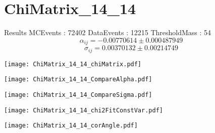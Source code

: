 \documentclass[a4paper,12pt]{article}
\begin{document}
\section{ChiMatrix\_14\_14}
\begin{minipage}{0.49\linewidth} Results \newline
MCEvents : 72402\newline
DataEvents : 12215 \newline
ThresholdMass : 54\\
$$\alpha_{ij} = -0.00770614\pm 0.000487949$$
$$\sigma_{ij} = 0.00370132\pm 0.00214749$$
\end{minipage}\hfill
\begin{minipage}{0.49\linewidth} 
\texttt{[image: ChiMatrix\_14\_14\_chiMatrix.pdf]}\\
\end{minipage}
\hfill
\begin{minipage}{0.49\linewidth} 
\texttt{[image: ChiMatrix\_14\_14\_CompareAlpha.pdf]}\\
\end{minipage}
\hfill
\begin{minipage}{0.49\linewidth} 
\texttt{[image: ChiMatrix\_14\_14\_CompareSigma.pdf]}\\
\end{minipage}
\begin{minipage}{0.49\linewidth} 
\texttt{[image: ChiMatrix\_14\_14\_chi2FitConstVar.pdf]}\\
\end{minipage}
\hfill
\begin{minipage}{0.49\linewidth} 
\texttt{[image: ChiMatrix\_14\_14\_corAngle.pdf]}\\
\end{minipage}
\end{document}
